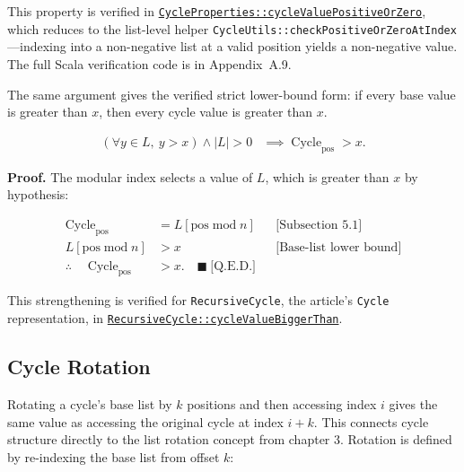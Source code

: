 This property is verified in
\href{https://github.com/thiagomata/prime-numbers/blob/cycle-article-v1.0.0/src/main/scala/v1/chapter4/cycle/properties/CycleProperties.scala}{\texttt{CycleProperties::cycleValuePositiveOrZero}},
which reduces to the list-level helper
\texttt{CycleUtils::checkPositiveOrZeroAtIndex}---indexing into a non-negative
list at a valid position yields a non-negative value. The full Scala
verification code is in Appendix~A.9.

The same argument gives the verified strict lower-bound form: if every base
value is greater than $x$, then every cycle value is greater than $x$.

\begin{equation*}
\begin{aligned}
(\forall y\in L,\ y>x)\land |L|>0
  &\implies \operatorname{Cycle}_{\text{pos}}>x.
\end{aligned}
\end{equation*}

\noindent\textbf{Proof.} The modular index selects a value of $L$, which is
greater than $x$ by hypothesis:

\begin{equation*}
\begin{aligned}
\operatorname{Cycle}_{\text{pos}}
  &=L[\text{pos}\operatorname{mod}n] && \text{[Subsection 5.1]} \\
L[\text{pos}\operatorname{mod}n]
  &>x && \text{[Base-list lower bound]} \\
\therefore\quad \operatorname{Cycle}_{\text{pos}}
  &>x.\quad \blacksquare\ \text{[Q.E.D.]}
\end{aligned}
\end{equation*}

{\raggedright
This strengthening is verified for \texttt{RecursiveCycle}, the article's
\texttt{Cycle} representation, in
\href{https://github.com/thiagomata/prime-numbers/blob/cycle-article-v1.0.0/src/main/scala/v1/chapter4/cycle/recursive/RecursiveCycle.scala#cycleValueBiggerThan}{\texttt{RecursiveCycle::cycleValueBiggerThan}}.
\par}

\subsection{Cycle Rotation}

Rotating a cycle's base list by $k$ positions and then accessing index $i$
gives the same value as accessing the original cycle at index $i+k$. This
connects cycle structure directly to the list rotation concept from chapter 3.
Rotation is defined by re-indexing the base list from offset $k$:

